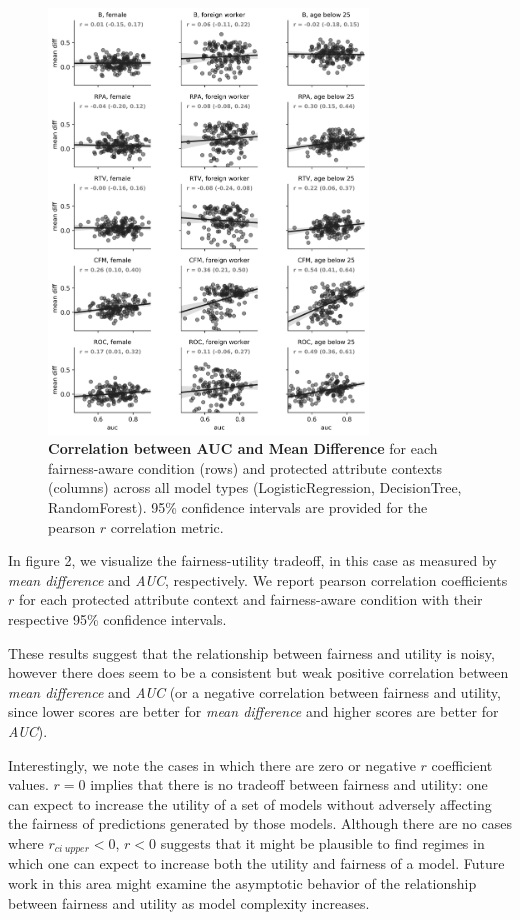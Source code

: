 \documentclass{acm_proc_article-sp}
\begin{document}
\begin{figure}[h]
\centering
\includegraphics[width=8.5cm]{IMG/fairness_utility_tradeoff.png}
\caption{
  \textbf{Correlation between AUC and Mean Difference} for each fairness-aware
  condition (rows) and protected attribute contexts (columns) across all model
  types (LogisticRegression, DecisionTree,   RandomForest). 95\% confidence
  intervals are provided for the pearson \(r\) correlation metric.}
\label{figure-2-fairness-utility-tradeoff}
\end{figure}

In figure 2, we visualize the fairness-utility tradeoff, in this case as
measured by \emph{mean difference} and \emph{AUC}, respectively. We report
pearson correlation coefficients \(r\) for each protected attribute context and
fairness-aware condition with their respective 95\% confidence intervals.

These results suggest that the relationship between fairness and utility is
noisy, however there does seem to be a consistent but weak positive correlation
between \emph{mean difference} and \emph{AUC} (or a negative correlation between
fairness and utility, since lower scores are better for \emph{mean difference}
and higher scores are better for \emph{AUC}).

Interestingly, we note the cases in which there are zero or negative \(r\)
coefficient values. \(r = 0\) implies that there is no tradeoff between fairness
and utility: one can expect to increase the utility of a set of models without
adversely affecting the fairness of predictions generated by those models.
Although there are no cases where \(r_{ci\ upper} < 0\), \(r < 0\) suggests that
it might be plausible to find regimes in which one can expect to increase both
the utility and fairness of a model. Future work in this area might examine the
asymptotic behavior of the relationship between fairness and utility as model
complexity increases.
\end{document}

